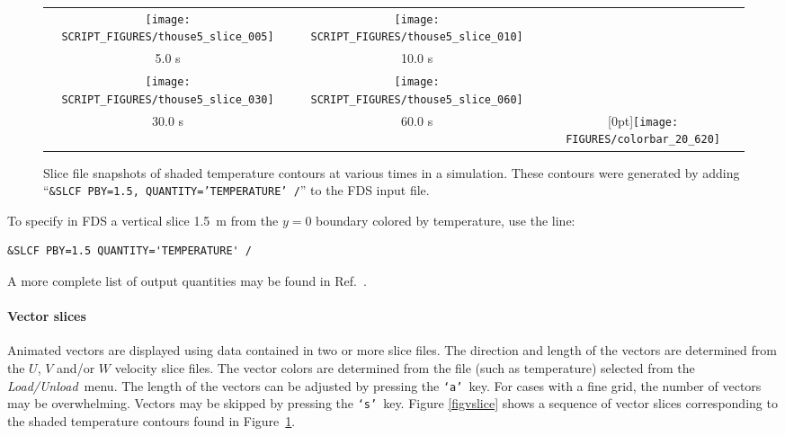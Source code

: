 \documentclass[11pt,twoside]{book}
\begin{document}
\begin{figure}[\figoptions]
\begin{center}
\begin{tabular}{ccc}
\texttt{[image: SCRIPT\_FIGURES/thouse5\_slice\_005]}&
\texttt{[image: SCRIPT\_FIGURES/thouse5\_slice\_010]}\\
5.0 s&10.0 s\\
\texttt{[image: SCRIPT\_FIGURES/thouse5\_slice\_030]}&
\texttt{[image: SCRIPT\_FIGURES/thouse5\_slice\_060]}&\\
30.0 s&60.0 s
&\raisebox{0.0ex}[0pt]{\texttt{[image: FIGURES/colorbar\_20\_620]}}\\
\end{tabular}
\caption [Slice file snapshots of shaded temperature contours.]
{Slice file snapshots of shaded temperature contours at various
times in a simulation. These contours were generated by adding
``{\tt \&SLCF PBY=1.5, QUANTITY='TEMPERATURE' /}'' to the FDS
input file. }
\label{figslice}%
\end{center}
\end{figure}

\indent To specify in FDS a vertical slice 1.5~m from the $y=0$
boundary colored by temperature, use the line:
\begin{lstlisting}[basicstyle=\ttfamily]
&SLCF PBY=1.5 QUANTITY='TEMPERATURE' /
\end{lstlisting}
A more complete list of output quantities may be found in
Ref.~\cite{FDS_Users_Guide}.

\paragraph{Vector slices}Animated vectors are displayed using data contained in two or more
slice files.  The direction and length of the vectors are
determined from the $U$, $V$ and/or $W$ velocity slice files. The
vector colors are determined from the file (such as temperature)
selected from the {\em Load/Unload}\ menu. The length of the
vectors can be adjusted by pressing the {\tt `a'}\ key. For cases
with a fine grid, the number of vectors may be overwhelming.
Vectors may be skipped by pressing the {\tt `s'}\ key.  Figure
\ref{figvslice} shows a sequence of vector slices corresponding to
the shaded temperature contours found in Figure~\ref{figslice}.
\end{document}
